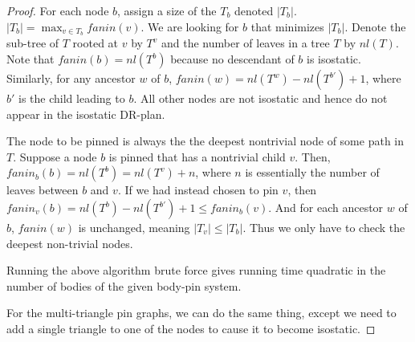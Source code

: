 \begin{proof}
    For each node $b$, assign a size of the $T_b$ denoted $|T_b|$. $|T_b| = \displaystyle\max_{v \in T_b} fanin(v)$. We are looking for $b$ that minimizes $|T_b|$. Denote the sub-tree of $T$ rooted at $v$ by $T^v$ and the number of leaves in a tree $T$ by $nl(T)$. Note that $fanin(b)= nl(T^b)$ because no descendant of $b$ is isostatic. Similarly, for any ancestor $w$ of $b$, $fanin(w) = nl(T^w)-nl(T^{b'})+1$, where $b'$ is the child leading to $b$. All other nodes are not isostatic and hence do not appear in the isostatic DR-plan.

    The node to be pinned is always the the deepest nontrivial node of some path in $T$. Suppose a node $b$ is pinned that has a nontrivial child $v$. Then, $fanin_b(b) = nl(T^b) = nl(T^v) + n$, where $n$ is essentially the number of leaves between $b$ and $v$. If we had instead chosen to pin $v$, then $fanin_v(b) = nl(T^b) - nl(T^{b'}) + 1 \leq fanin_b(v)$. And for each ancestor $w$ of $b$, $fanin(w)$ is unchanged, meaning $|T_v| \leq |T_b|$. Thus we only have to check the deepest non-trivial nodes.

    Running the above algorithm brute force  gives running time quadratic in the number of bodies of the given body-pin system.

    For the multi-triangle pin graphs, we can do the same thing, except we need to add a single triangle to one of the nodes to cause it to become isostatic.
\end{proof}

